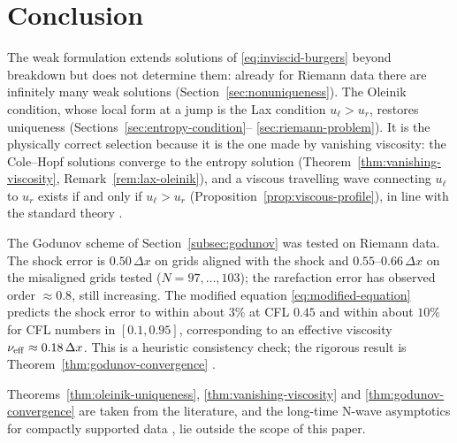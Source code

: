 \section{Conclusion}
\label{sec:conclusion}

The weak formulation extends solutions of \eqref{eq:inviscid-burgers} beyond
breakdown but does not determine them: already for Riemann data there are
infinitely many weak solutions (Section~\ref{sec:nonuniqueness}). The Oleinik
condition, whose local form at a jump is the Lax condition $u_\ell>u_r$,
restores uniqueness (Sections~\ref{sec:entropy-condition}--%
\ref{sec:riemann-problem}). It is the physically correct selection because it
is the one made by vanishing viscosity: the Cole--Hopf solutions converge to
the entropy solution (Theorem~\ref{thm:vanishing-viscosity},
Remark~\ref{rem:lax-oleinik}), and a viscous travelling wave connecting
$u_\ell$ to $u_r$ exists if and only if $u_\ell>u_r$
(Proposition~\ref{prop:viscous-profile}), in line with the standard theory
\cite[\S3.4]{evans2010}.

The Godunov scheme of Section~\ref{subsec:godunov} was tested on Riemann
data. The shock error is $0.50\,\Delta x$ on grids aligned with the shock and
$0.55$--$0.66\,\Delta x$ on the misaligned grids tested ($N=97,\dots,103$); the rarefaction error has observed order
$\approx0.8$, still increasing. The modified equation
\eqref{eq:modified-equation} predicts the shock error to within about $3\%$ at CFL
$0.45$ and within about $10\%$ for CFL numbers in $[0.1,0.95]$, corresponding
to an effective viscosity $\nu_{\rm eff}\approx0.18\,\Delta x$. This is a
heuristic consistency check; the rigorous result is
Theorem~\ref{thm:godunov-convergence} \cite{crandall1980}.

Theorems~\ref{thm:oleinik-uniqueness}, \ref{thm:vanishing-viscosity} and
\ref{thm:godunov-convergence} are taken from the literature, and the long-time
N-wave asymptotics for compactly supported data \cite{lax1957},
\cite[\S3.4.5]{evans2010} lie outside the scope of this paper.